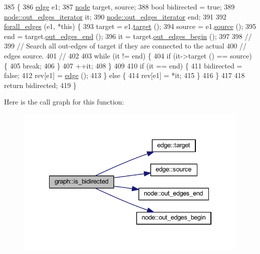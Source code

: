 \begin{DoxyCode}
385                                                    \{
386     \mbox{\hyperlink{classedge}{edge}} e1;
387     \mbox{\hyperlink{classnode}{node}} target, source;
388     \textcolor{keywordtype}{bool} bidirected = \textcolor{keyword}{true};
389     \mbox{\hyperlink{classnode_a90e17ed34de55072e8077f4367499a98}{node::out\_edges\_iterator}} it;
390     \mbox{\hyperlink{classnode_a90e17ed34de55072e8077f4367499a98}{node::out\_edges\_iterator}} end;
391 
392     \mbox{\hyperlink{graph_8h_ac57b09543204dcb7a1e2c76c793cf038}{forall\_edges}} (e1, *\textcolor{keyword}{this}) \{
393     target = e1.\mbox{\hyperlink{classedge_a97563b611261478ee19c6ce055f1a3ee}{target}} ();
394     source = e1.\mbox{\hyperlink{classedge_ae82d5701f7e6f71edc3c8b0e34bcd2b7}{source}} ();
395     end = target.\mbox{\hyperlink{classnode_a7ce2ba5195a63d4df6b44299a02a9378}{out\_edges\_end}} ();
396     it = target.\mbox{\hyperlink{classnode_a7dcb80df22118cea04f77ca8c952d9c2}{out\_edges\_begin}} ();
397 
398     \textcolor{comment}{//}
399     \textcolor{comment}{// Search all out-edges of target if they are connected to the actual}
400     \textcolor{comment}{// edges source.}
401     \textcolor{comment}{//}
402 
403     \textcolor{keywordflow}{while} (it != end) \{ 
404         \textcolor{keywordflow}{if} (it->target () == source) \{
405         \textcolor{keywordflow}{break};
406         \}
407         ++it;
408     \}
409 
410     \textcolor{keywordflow}{if} (it == end) \{
411         bidirected = \textcolor{keyword}{false};
412         rev[e1] = \mbox{\hyperlink{classedge}{edge}} ();
413     \} \textcolor{keywordflow}{else} \{
414         rev[e1] = *it;
415     \}
416     \}
417     
418     \textcolor{keywordflow}{return} bidirected;
419 \}
\end{DoxyCode}
Here is the call graph for this function\+:
\nopagebreak
\begin{figure}[H]
\begin{center}
\leavevmode
\includegraphics[width=334pt]{classgraph_a8014a8073dd640c91cbd4fc1fb6e6071_cgraph}
\end{center}
\end{figure}
\mbox{\label{classgraph_a599e2bf967df8a2052a9892c94db98b7}} 
